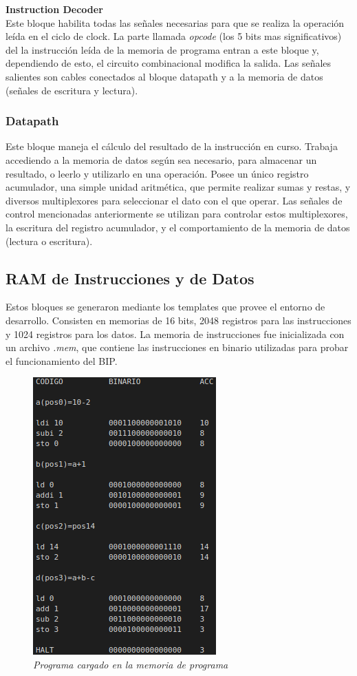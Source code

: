 \documentclass[12pt,A4paper,titlepage]{article}
\begin{document}
\textbf{Instruction Decoder} \\
Este bloque habilita todas las señales necesarias para que se realiza la operación leída en el ciclo de clock. La parte llamada \textit{opcode} (los 5 bits mas significativos) del la instrucción leída de la memoria de programa entran a este bloque y, dependiendo de esto, el circuito combinacional modifica la salida. Las señales salientes son cables conectados al bloque datapath y a la memoria de datos (señales de escritura y lectura).

\subsubsection{Datapath}
Este bloque maneja el cálculo del resultado de la instrucción en curso. Trabaja accediendo a la memoria de datos según sea necesario, para almacenar un resultado, o leerlo y utilizarlo en una operación. Posee un único registro acumulador, una simple unidad aritmética, que permite realizar sumas y restas, y diversos multiplexores para seleccionar el dato con el que operar. Las señales de control mencionadas anteriormente se utilizan para controlar estos multiplexores, la escritura del registro acumulador, y el comportamiento de la memoria de datos (lectura o escritura).

\subsection{RAM de Instrucciones y de Datos} \label{ram-de-instrucciones-y-de-datos}
Estos bloques se generaron mediante los templates que provee el entorno de desarrollo. Consisten en memorias de 16 bits, 2048 registros para las instrucciones y 1024 registros para los datos.
La memoria de instrucciones fue inicializada con un archivo \textit{.mem}, que contiene las instrucciones en binario utilizadas para probar el funcionamiento del BIP.

\begin{figure} [H]
    \centering
    \includegraphics{figure/program_memory.png}
    \caption{\textit{Programa cargado en la memoria de programa}}
    \label{fig:program_memory.txt}
\end{figure}
\end{document}

